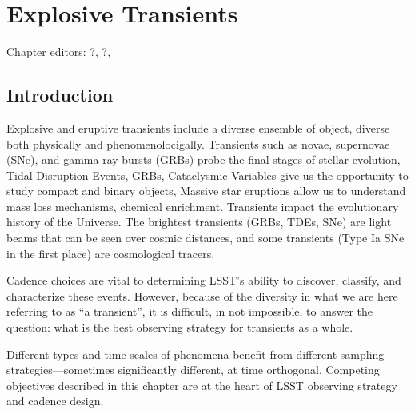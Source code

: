 
\chapter[Eruptive and Explosive Transients]{Explosive Transients}
\def\chpname{transients}\label{chp:\chpname}


Chapter editors:
?,
?,



\section{Introduction}


Explosive and eruptive transients include a diverse ensemble of object, diverse both physically and phenomenolocigally. Transients such as novae, supernovae (SNe), and gamma-ray bursts (GRBs) probe the final stages of stellar evolution, Tidal Disruption Events, GRBs, Cataclysmic Variables give us the opportunity to study compact and binary objects, Massive star eruptions allow us to understand mass loss mechanisms, chemical enrichment. Transients impact the evolutionary history of the Universe. The brightest transients (GRBs, TDEs, SNe) are light beams that can be seen over cosmic distances, and some transients (Type Ia SNe in the first place) are cosmological tracers.

Cadence choices are vital to determining LSST's ability to discover, classify, and characterize these events. However, because of the diversity in what we are here referring to as ``a transient'', it is difficult, in not impossible, to answer the question: what is the best observing strategy for transients as a whole. 

Different types and time scales of phenomena benefit from different sampling strategies---sometimes significantly different, at time orthogonal.  Competing objectives described in this chapter are at the heart of LSST observing strategy and cadence design.

